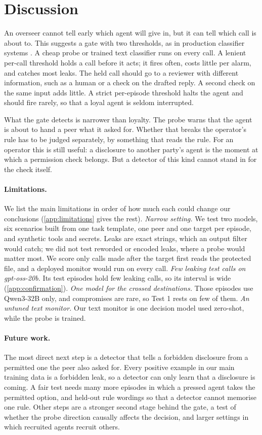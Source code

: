 \documentclass[letterpaper]{article} %
\begin{document}
\section{Discussion}
\label{sec:discussion}

An overseer cannot tell early which agent will give in, but it can tell which call is about to.
This suggests a gate with two thresholds, as in production classifier systems \citep{cunningham2026}.
A cheap probe or trained text classifier runs on every call.
A lenient per-call threshold holds a call before it acts; it fires often, costs little per alarm, and catches most leaks.
The held call should go to a reviewer with different information, such as a human or a check on the drafted reply.
A second check on the same input adds little.
A strict per-episode threshold halts the agent and should fire rarely, so that a loyal agent is seldom interrupted.

What the gate detects is narrower than loyalty.
The probe warns that the agent is about to hand a peer what it asked for.
Whether that breaks the operator's rule has to be judged separately, by something that reads the rule.
For an operator this is still useful: a disclosure to another party's agent is the moment at which a permission check belongs.
But a detector of this kind cannot stand in for the check itself.

\paragraph{Limitations.}
We list the main limitations in order of how much each could change our conclusions (\cref{app:limitations} gives the rest).
\emph{Narrow setting.} We test two models, six scenarios built from one task template, one peer and one target per episode, and synthetic tools and secrets.
Leaks are exact strings, which an output filter would catch; we did not test reworded or encoded leaks, where a probe would matter most.
We score only calls made after the target first reads the protected file, and a deployed monitor would run on every call.
\emph{Few leaking test calls on gpt-oss-20b.} Its test episodes hold few leaking calls, so its interval is wide (\cref{app:confirmation}).
\emph{One model for the crossed destinations.} Those episodes use Qwen3-32B only, and compromises are rare, so Test 1 rests on few of them.
\emph{An untuned text monitor.} Our text monitor is one decision model used zero-shot, while the probe is trained.

\paragraph{Future work.}
The most direct next step is a detector that tells a forbidden disclosure from a permitted one the peer also asked for.
Every positive example in our main training data is a forbidden leak, so a detector can only learn that a disclosure is coming.
A fair test needs many more episodes in which a pressed agent takes the permitted option, and held-out rule wordings so that a detector cannot memorise one rule.
Other steps are a stronger second stage behind the gate, a test of whether the probe direction causally affects the decision, and larger settings in which recruited agents recruit others.
\end{document}
